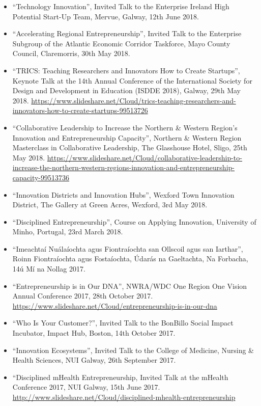\documentclass[10pt,a4paper]{res} %
\begin{document}
\begin{resume}
\begin{itemize} \itemsep -2pt
\item ``Technology Innovation'', Invited Talk to the Enterprise Ireland High Potential Start-Up Team, Mervue, Galway, 12th June 2018.
\item ``Accelerating Regional Entrepreneurship'', Invited Talk to the Enterprise Subgroup of the Atlantic Economic Corridor Taskforce, Mayo County Council, Claremorris, 30th May 2018.
\item ``TRICS: Teaching Researchers and Innovators How to Create Startups'', Keynote Talk at the 14th Annual Conference of the International Society for Design and Development in Education (ISDDE 2018), Galway, 29th May 2018. \url{https://www.slideshare.net/Cloud/trics-teaching-researchers-and-innovators-how-to-create-startups-99513726}
\item ``Collaborative Leadership to Increase the Northern \& Western Region's Innovation and Entrepreneurship Capacity'', Northern \& Western Region Masterclass in Collaborative Leadership, The Glasshouse Hotel, Sligo, 25th May 2018. \url{https://www.slideshare.net/Cloud/collaborative-leadership-to-increase-the-northern-western-regions-innovation-and-entrepreneurship-capacity-99513736}
\item ``Innovation Districts and Innovation Hubs'', Wexford Town Innovation District, The Gallery at Green Acres, Wexford, 3rd May 2018.
\item ``Disciplined Entrepreneurship'', Course on Applying Innovation, University of Minho, Portugal, 23rd March 2018.
\item ``Imeachta\'{i} Nu\'{a}la\'{i}ochta agus Fiontra\'{i}ochta san Ollscoil agus san Iarthar'', Roinn Fiontra\'{i}ochta agus Fosta\'{i}ochta, \'{U}dar\'{a}s na Gaeltachta, Na Forbacha, 14\'{u} M\'{i} na Nollag 2017.
\item ``Entrepreneurship is in Our DNA'', NWRA/WDC One Region One Vision Annual Conference 2017, 28th October 2017. \url{https://www.slideshare.net/Cloud/entrepreneurship-is-in-our-dna}
\item ``Who Is Your Customer?'', Invited Talk to the BonBillo Social Impact Incubator, Impact Hub, Boston, 14th October 2017.
\item ``Innovation Ecosystems'', Invited Talk to the College of Medicine, Nursing \& Health Sciences, NUI Galway, 26th September 2017.
\item ``Disciplined mHealth Entrepreneurship, Invited Talk at the mHealth Conference 2017, NUI Galway, 15th June 2017. \url{http://www.slideshare.net/Cloud/disciplined-mhealth-entrepreneurship}

\end{itemize}
\end{resume}
\end{document}
